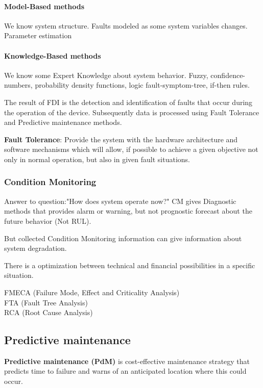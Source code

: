 \documentclass[class=article, crop=false]{standalone}
\begin{document}
\paragraph{Model-Based methods}
We know system structure. Faults modeled as some system variables changes.
Parameter estimation

\paragraph{Knowledge-Based methods}
We know some Expert Knowledge about system behavior. Fuzzy,
confidence-numbers, probability density functions, logic
fault-symptom-tree, if-then rules.

The result of FDI is the detection and identification of faults that occur
during the operation of the device. Subsequently data is processed using
Fault Tolerance and Predictive maintenance methods.

\textbf{Fault Tolerance}: Provide the system with the hardware architecture and
  software mechanisms which will allow, if possible to achieve a given
  objective not only in normal operation, but also in given fault
  situations.


\subsubsection{Condition Monitoring}
Answer to question:"How does system operate now?"
CM gives Diagnostic methods that provides alarm or warning, but not
prognostic forecast about the future behavior (Not RUL).

But collected Condition Monitoring information can give information about
system degradation.


There is a optimization between technical and financial possibilities in a
specific situation.

FMECA (Failure Mode, Effect and Criticality Analysis) \\
FTA (Fault Tree Analysis) \\
RCA (Root Cause Analysis) \\


% 


\subsection{Predictive maintenance}
\textbf{Predictive maintenance (PdM)} is cost-effective maintenance strategy that
predicts time to failure and warns of an anticipated location where this
could occur.
\end{document}

